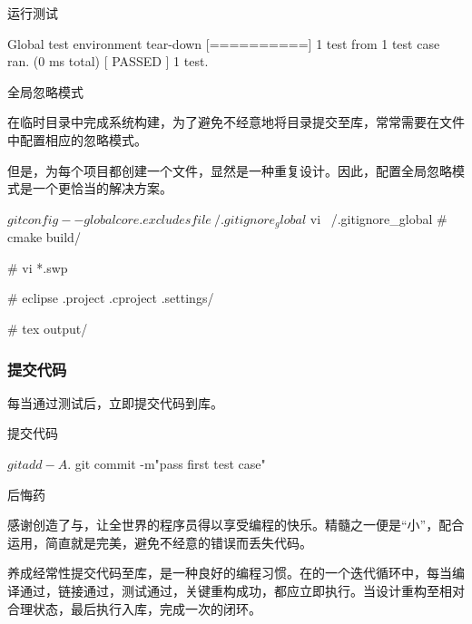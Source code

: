 \begin{content}
\begin{nodiff}{运行测试}
\begin{c++}
[----------] Global test environment tear-down
[==========] 1 test from 1 test case ran. (0 ms total)
[  PASSED  ] 1 test.
 \end{c++}
\end{nodiff}

\begin{episode}{全局忽略模式}

\begin{content}

在临时目录中完成系统构建，为了避免不经意地将目录提交至库，常常需要在文件中配置相应的忽略模式。

但是，为每个项目都创建一个文件，显然是一种重复设计。因此，配置全局忽略模式是一个更恰当的解决方案。

 \begin{c++}
$ git config --global core.excludesfile ~/.gitignore_global
$ vi ~/.gitignore_global
# cmake
build/

# vi
*.swp

# eclipse
.project
.cproject
.settings/

# tex
output/
 \end{c++}

\end{content}
\end{episode}

\subsubsection{提交代码}

每当通过测试后，立即提交代码到库。

\begin{nodiff}{提交代码}
 \begin{c++}
$ git add -A .
$ git commit -m"pass first test case"
 \end{c++}
\end{nodiff}

\begin{episode}{后悔药}

\begin{content}

感谢创造了与，让全世界的程序员得以享受编程的快乐。精髓之一便是“小”，配合运用，简直就是完美，避免不经意的错误而丢失代码。

养成经常性提交代码至库，是一种良好的编程习惯。在的一个迭代循环中，每当编译通过，链接通过，测试通过，关键重构成功，都应立即执行。当设计重构至相对合理状态，最后执行入库，完成一次的闭环。


\end{content}
\end{episode}
\end{content}
